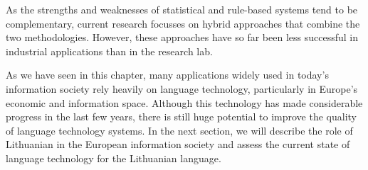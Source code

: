 \begin{multicols}{2}

As the strengths and weaknesses of statistical and rule-based systems tend to be complementary, current research focusses on hybrid approaches that combine the two methodologies. However, these approaches have so far been less successful in industrial applications than in the research lab. 

As we have seen in this chapter, many applications widely used in today’s information society rely heavily on language technology, particularly in Europe’s economic and information space. Although this technology has made considerable progress in the last few years, there is still huge potential to improve the quality of language technology systems. In the next section, we will describe the role of Lithuanian in the European information society and assess the current state of language technology for the Lithuanian language.
\end{multicols}

\clearpage


